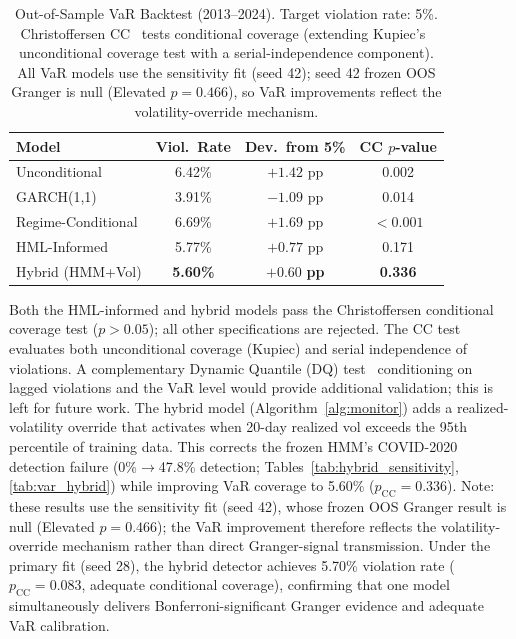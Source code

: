 \documentclass[sigconf,anonymous]{acmart}
\begin{document}
\begin{table}[t]
\centering
\setlength{\tabcolsep}{4pt}
\caption[Out-of-Sample VaR Backtest (2013--2024)]{Out-of-Sample VaR Backtest (2013--2024). Target violation rate: 5\%.
Christoffersen CC~\cite{christoffersen1998evaluating} tests conditional coverage (extending Kupiec's~\cite{kupiec1995techniques} unconditional coverage test with a serial-independence component).
All VaR models use the sensitivity fit (seed 42); seed 42 frozen OOS Granger is null (Elevated $p = 0.466$),
so VaR improvements reflect the volatility-override mechanism.}
\label{tab:var}
\small
\begin{tabular}{lccc}
\toprule
Model & Viol.\ Rate & Dev.\ from 5\% & CC $p$-value \\
\midrule
Unconditional & 6.42\% & $+1.42$ pp & 0.002 \\
GARCH(1,1) & 3.91\% & $-1.09$ pp & 0.014 \\
Regime-Conditional & 6.69\% & $+1.69$ pp & $< 0.001$ \\
HML-Informed & 5.77\% & $+0.77$ pp & 0.171 \\
Hybrid (HMM+Vol) & \textbf{5.60\%} & $\mathbf{+0.60}$ \textbf{pp} & \textbf{0.336} \\
\bottomrule
\end{tabular}
\end{table}
\setlength{\tabcolsep}{6pt}

Both the HML-informed and hybrid models pass the Christoffersen conditional
coverage test ($p > 0.05$); all other specifications are rejected.
The CC test evaluates both unconditional coverage (Kupiec) and serial independence
of violations. A complementary Dynamic Quantile (DQ)
test~\cite{engle2004caviar} conditioning on lagged violations and the VaR level
would provide additional validation; this is left for future work. The hybrid
model (Algorithm~\ref{alg:monitor}) adds a realized-volatility override that
activates when 20-day realized vol exceeds the 95th percentile of training
data. This corrects the frozen HMM's COVID-2020 detection failure
(0\%$\to$47.8\% detection; Tables~\ref{tab:hybrid_sensitivity},
\ref{tab:var_hybrid}) while improving VaR coverage to 5.60\%
($p_{\text{CC}} = 0.336$). Note: these results use the sensitivity fit
(seed 42), whose frozen OOS Granger result is null (Elevated $p = 0.466$);
the VaR improvement therefore reflects the volatility-override mechanism rather
than direct Granger-signal transmission. Under the primary fit (seed 28), the
hybrid detector achieves 5.70\% violation rate ($p_{\text{CC}} = 0.083$,
adequate conditional coverage), confirming that one model simultaneously
delivers Bonferroni-significant Granger evidence and adequate VaR calibration.
\end{document}
